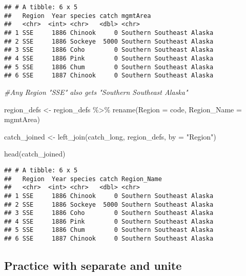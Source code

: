 \documentclass[
]{article}
\newenvironment{Shaded}{\begin{snugshade}}{\end{snugshade}}
\newcommand{\AttributeTok}[1]{\textcolor[rgb]{0.77,0.63,0.00}{#1}}
\newcommand{\CommentTok}[1]{\textcolor[rgb]{0.56,0.35,0.01}{\textit{#1}}}
\newcommand{\FunctionTok}[1]{\textcolor[rgb]{0.00,0.00,0.00}{#1}}
\newcommand{\NormalTok}[1]{#1}
\newcommand{\OtherTok}[1]{\textcolor[rgb]{0.56,0.35,0.01}{#1}}
\newcommand{\SpecialCharTok}[1]{\textcolor[rgb]{0.00,0.00,0.00}{#1}}
\newcommand{\StringTok}[1]{\textcolor[rgb]{0.31,0.60,0.02}{#1}}
\begin{document}
\begin{verbatim}
## # A tibble: 6 x 5
##   Region  Year species catch mgmtArea                 
##   <chr>  <int> <chr>   <dbl> <chr>                    
## 1 SSE     1886 Chinook     0 Southern Southeast Alaska
## 2 SSE     1886 Sockeye  5000 Southern Southeast Alaska
## 3 SSE     1886 Coho        0 Southern Southeast Alaska
## 4 SSE     1886 Pink        0 Southern Southeast Alaska
## 5 SSE     1886 Chum        0 Southern Southeast Alaska
## 6 SSE     1887 Chinook     0 Southern Southeast Alaska
\end{verbatim}

\begin{Shaded}
\begin{Highlighting}[]
\CommentTok{\#Any Region "SSE" also gets "Southern Southeast Alaska"}
\end{Highlighting}
\end{Shaded}

\begin{Shaded}
\begin{Highlighting}[]
\NormalTok{region\_defs }\OtherTok{\textless{}{-}}\NormalTok{ region\_defs }\SpecialCharTok{\%\textgreater{}\%}
  \FunctionTok{rename}\NormalTok{(}\AttributeTok{Region =}\NormalTok{ code, }\AttributeTok{Region\_Name =}\NormalTok{ mgmtArea)}

\NormalTok{catch\_joined }\OtherTok{\textless{}{-}} \FunctionTok{left\_join}\NormalTok{(catch\_long, region\_defs, }\AttributeTok{by =} \StringTok{"Region"}\NormalTok{)}

\FunctionTok{head}\NormalTok{(catch\_joined)}
\end{Highlighting}
\end{Shaded}

\begin{verbatim}
## # A tibble: 6 x 5
##   Region  Year species catch Region_Name              
##   <chr>  <int> <chr>   <dbl> <chr>                    
## 1 SSE     1886 Chinook     0 Southern Southeast Alaska
## 2 SSE     1886 Sockeye  5000 Southern Southeast Alaska
## 3 SSE     1886 Coho        0 Southern Southeast Alaska
## 4 SSE     1886 Pink        0 Southern Southeast Alaska
## 5 SSE     1886 Chum        0 Southern Southeast Alaska
## 6 SSE     1887 Chinook     0 Southern Southeast Alaska
\end{verbatim}

\hypertarget{practice-with-separate-and-unite}{%
\subsection{Practice with separate and
unite}\label{practice-with-separate-and-unite}}
\end{document}
